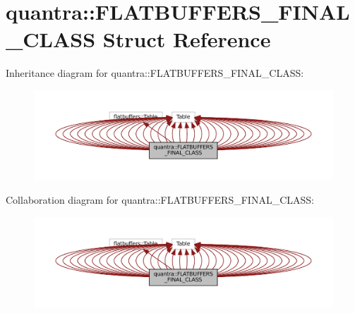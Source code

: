 \hypertarget{structquantra_1_1FLATBUFFERS__FINAL__CLASS}{}\section{quantra\+:\+:F\+L\+A\+T\+B\+U\+F\+F\+E\+R\+S\+\_\+\+F\+I\+N\+A\+L\+\_\+\+C\+L\+A\+SS Struct Reference}
\label{structquantra_1_1FLATBUFFERS__FINAL__CLASS}


Inheritance diagram for quantra\+:\+:F\+L\+A\+T\+B\+U\+F\+F\+E\+R\+S\+\_\+\+F\+I\+N\+A\+L\+\_\+\+C\+L\+A\+SS\+:\nopagebreak
\begin{figure}[H]
\begin{center}
\leavevmode
\includegraphics[width=350pt]{structquantra_1_1FLATBUFFERS__FINAL__CLASS__inherit__graph}
\end{center}
\end{figure}


Collaboration diagram for quantra\+:\+:F\+L\+A\+T\+B\+U\+F\+F\+E\+R\+S\+\_\+\+F\+I\+N\+A\+L\+\_\+\+C\+L\+A\+SS\+:\nopagebreak
\begin{figure}[H]
\begin{center}
\leavevmode
\includegraphics[width=350pt]{structquantra_1_1FLATBUFFERS__FINAL__CLASS__coll__graph}
\end{center}
\end{figure}
